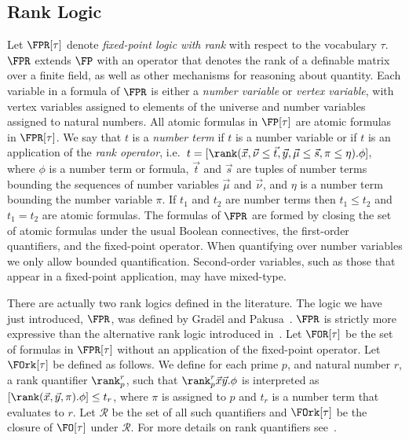 \documentclass[a4paper,UKenglish]{lipics-v2018}
\begin{document}
\subsection{Rank Logic}
Let $\FPR[\tau]$ denote \emph{fixed-point logic with rank} with respect to the
vocabulary $\tau$. $\FPR$ extends $\FP$ with an operator that denotes the rank
of a definable matrix over a finite field, as well as other mechanisms for
reasoning about quantity. Each variable in a formula of $\FPR$ is either a
\emph{number variable} or \emph{vertex variable}, with vertex variables assigned
to elements of the universe and number variables assigned to natural numbers.
All atomic formulas in $\FP[\tau]$ are atomic formulas in $\FPR[\tau]$. We say
that $t$ is a \emph{number term} if $t$ is a number variable or if $t$ is an
application of the \emph{rank operator}, i.e.\ $t = [\rank (\vec{x}, \vec {\nu}
\leq \vec{t}, \vec{y},\vec{\mu} \leq \vec{s}, \pi \leq \eta). \phi]$, where
$\phi$ is a number term or formula, $\vec{t}$ and $\vec{s}$ are tuples of number
terms bounding the sequences of number variables $\vec{\mu}$ and $\vec{\nu}$,
and $\eta$ is a number term bounding the number variable $\pi$. If $t_1$ and
$t_2$ are number terms then $t_1 \leq t_2$ and $t_1 = t_2$ are atomic formulas.
The formulas of $\FPR$ are formed by closing the set of atomic formulas under
the usual Boolean connectives, the first-order quantifiers, and the fixed-point
operator. When quantifying over number variables we only allow bounded
quantification. Second-order variables, such as those that appear in a
fixed-point application, may have mixed-type.

There are actually two rank logics defined in the literature. The logic we have
just introduced, $\FPR$, was defined by Grad{\"e}l and Pakusa~\cite{GradelP15a}.
$\FPR$ is strictly more expressive than the alternative rank logic introduced
in~\cite{Dawar09logicswith}. Let $\FOR[\tau]$ be the set of formulas in
$\FPR[\tau]$ without an application of the fixed-point operator. Let
$\FOrk[\tau]$ be defined as follows. We define for each prime $p$, and natural
number $r$, a rank quantifier $\rank^r_p$, such that $\rank^r_p\vec{x}\vec{y}.
\phi$ is interpreted as $[\rank (\vec{x}, \vec{y}, \pi) . \phi] \leq t_r$, where
$\pi$ is assigned to $p$ and $t_r$ is a number term that evaluates to $r$. Let
$\mathcal{R}$ be the set of all such quantifiers and $\FOrk[\tau]$ be the
closure of $\FO[\tau]$ under $\mathcal{R}$. For more details on rank quantifiers
see~\cite{Dawar09logicswith}.
\end{document}
